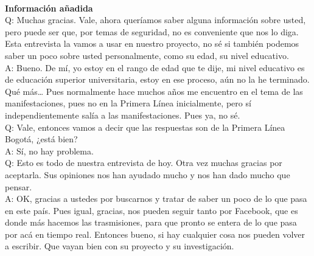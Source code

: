\documentclass{phyasgn}\usepackage{nag}
\begin{document}
\\
\textbf{Información añadida} \\
Q: Muchas gracias. Vale, ahora queríamos saber alguna información sobre usted, pero puede ser que, por temas de seguridad, no es conveniente que nos lo diga. Esta entrevista la vamos a usar en nuestro proyecto, no sé si también podemos saber un poco sobre usted personalmente, como su edad, su nivel educativo.\\
A: Bueno. De mí, yo estoy en el rango de edad que te dije, mi nivel educativo es de educación superior universitaria, estoy en ese proceso, aún no la he terminado. Qué más… Pues normalmente hace muchos años me encuentro en el tema de las manifestaciones, pues no en la Primera Línea inicialmente, pero sí independientemente salía a las manifestaciones. Pues ya, no sé.\\
Q: Vale, entonces vamos a decir que las respuestas son de la Primera Línea Bogotá, ¿está bien?\\
A: Sí, no hay problema.\\
Q: Esto es todo de nuestra entrevista de hoy. Otra vez muchas gracias por aceptarla. Sus opiniones nos han ayudado mucho y nos han dado mucho que pensar.\\
A: OK, gracias a ustedes por buscarnos y tratar de saber un poco de lo que pasa en este país. Pues igual, gracias, nos pueden seguir tanto por Facebook, que es donde más hacemos las trasmisiones, para que pronto se entera de lo que pasa por acá en tiempo real. Entonces bueno, si hay cualquier cosa nos pueden volver a escribir. Que vayan bien con su proyecto y su investigación.\\
\end{document}
